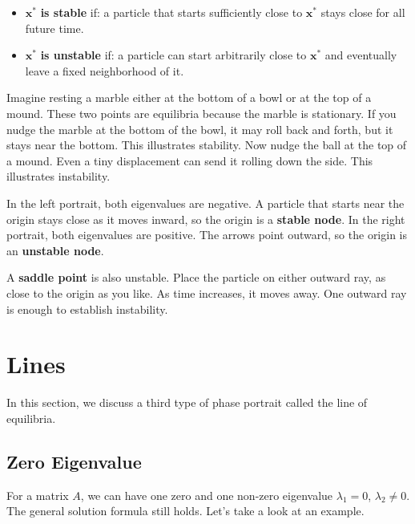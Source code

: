 \documentclass[10pt,letterpaper]{article}
\begin{document}
\begin{itemize}
    \item $\textbf{x}^*$\textbf{ is stable} if: a particle that starts sufficiently close
    to $\mathbf{x}^*$ stays close for all future time.
    \item $\textbf{x}^*$\textbf{ is unstable} if: a particle can start arbitrarily close
    to $\mathbf{x}^*$ and eventually leave a fixed neighborhood of it.
\end{itemize}

Imagine resting a marble either at the bottom of a bowl or at the top of a mound. These two points are equilibria because the marble is stationary. 
If you nudge the marble at the bottom of the bowl, it  may roll back and forth, but it stays near
the bottom. This illustrates stability. Now nudge the ball at the top of a mound. Even a tiny displacement can send it rolling down the side. This illustrates instability.

In the left portrait, both eigenvalues are negative. A particle that
starts near the origin stays close as it moves inward, so the origin
is a \textbf{stable node}. In the right portrait, both eigenvalues are
positive. The arrows point outward, so the origin is an
\textbf{unstable node}.

A \textbf{saddle point} is also unstable. Place the particle on either
outward ray, as close to the origin as you like. As time increases,
it moves away. One outward ray is enough to establish instability.

\section{Lines}
In this section, we discuss a third type of phase portrait called the line of equilibria.

\subsection{Zero Eigenvalue}
For a matrix $A$, we can have one zero and one non-zero eigenvalue $\lambda_1=0$, $\lambda_2\ne0$. The general solution formula still holds. Let's take a look at an example.
\end{document}
